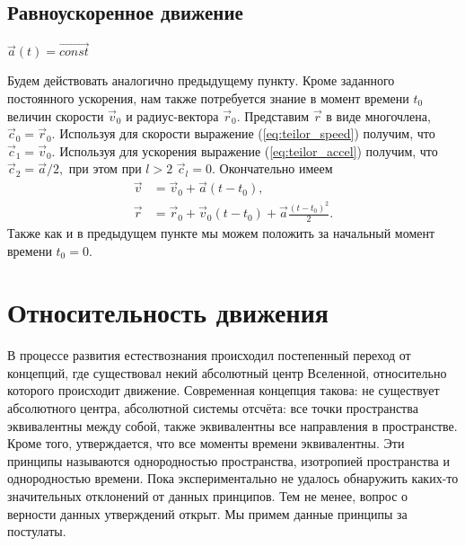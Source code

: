 \subsection{Равноускоренное движение}
\begin{definition} $\vec{a}(t) = \overrightarrow{const}$\end{definition}
Будем действовать аналогично предыдущему пункту. Кроме заданного постоянного ускорения, нам также
потребуется знание в момент времени $t_0$ величин скорости $\vec{v}_0$ и радиус-вектора $\vec{r}_0.$
Представим $\vec{r}$ в виде многочлена, $\vec{c}_0 = \vec{r}_0.$ Используя для скорости
выражение (\ref{eq:teilor_speed}) получим, что $\vec{c}_1 = \vec{v}_0.$ Используя
для ускорения выражение (\ref{eq:teilor_accel}) получим, что
$\vec{c}_2 = \vec{a}/2,$ при этом при $l>2$ $\vec{c}_l = 0.$ Окончательно имеем
\begin{subequations}
\begin{align}
\vec{v}& = \vec{v}_0 + \vec{a} (t-t_0),\label{eq:const_accel_speed}\\
\vec{r}& = \vec{r}_0 + \vec{v}_0 (t-t_0) + \vec {a} \frac{(t-t_0)^2}{2}\label{eq:const_accel_coord}.
\end{align}
\end{subequations}
Также как и в предыдущем пункте мы можем положить за начальный момент времени
$t_0 = 0.$

\section{Относительность движения}
В процессе развития естествознания происходил постепенный переход от концепций, где
существовал некий абсолютный центр Вселенной, относительно которого происходит движение.
Современная концепция такова: не существует абсолютного центра, абсолютной системы отсчёта:
все точки пространства эквивалентны между собой, также эквивалентны все направления в пространстве.
Кроме того, утверждается, что все моменты времени эквивалентны. Эти принципы называются
однородностью пространства, изотропией пространства и однородностью времени. Пока экспериментально
не удалось обнаружить каких-то значительных отклонений от данных принципов. Тем не менее, вопрос
о верности данных утверждений открыт. Мы примем данные принципы за постулаты.

